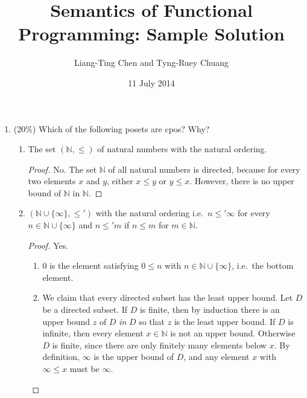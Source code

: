 \documentclass{article}
\title{Semantics of Functional Programming: Sample Solution}
\author{Liang-Ting Chen and Tyng-Ruey Chuang}
\date{11 July 2014}
\begin{document}
\maketitle

\begin{enumerate}
  \item (20\%) Which of the following posets are cpos? Why?
    \begin{enumerate}
      \item The set $(\mathbb{N}, \leq)$
        of natural numbers with the natural ordering. 
        \begin{proof}
          No. The set $\mathbb{N}$ of all natural numbers is directed, because
          for every two elements $x$ and $y$, either $x \leq y$ or $y \leq x$.
          However, there is no upper bound of $\mathbb{N}$ in $\mathbb{N}$.
        \end{proof}
      \item $(\mathbb{N} \cup \{\infty\}, \leq')$ with the natural ordering
        i.e.\ $n \leq' \infty$ for every $n \in \mathbb{N} \cup \{\infty\}$
        and $n \leq' m$ if $n \leq m$ for $m \in \mathbb{N}$. 
        \begin{proof}
          Yes.
          \begin{enumerate}
            \item $0$ is the element satisfying $0 \leq n$ with $n \in
              \mathbb{N}\cup\{\infty\}$, i.e.\ the bottom element. 
            \item We claim that every directed subset has the least upper
              bound. Let $D$ be a directed subset. If $D$ is finite, then by
              induction there is an upper bound $z$ of $D$ \emph{in} $D$ so that
              $z$ is the least upper bound. 
              If $D$ is infinite, then every element $x \in \mathbb{N}$ is not
              an upper bound. Otherwise $D$ is finite, since there are only
              finitely many elements below $x$. 
              By definition, $\infty$ is the upper bound of $D$,
              and any element $x$ with $\infty \leq x$ must be $\infty$. 
          \end{enumerate}


\end{proof}
\end{enumerate}
\end{enumerate}
\end{document}
